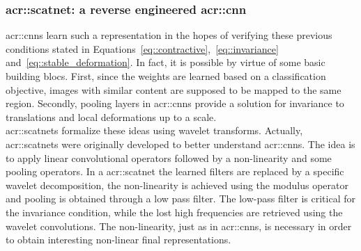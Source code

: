         \subsubsection{\gls*{acr::scatnet}: a reverse engineered \gls*{acr::cnn}}
            \glspl{acr::cnn} learn such a representation in the hopes of verifying these previous conditions stated in Equations~\ref{eq::contractive},~\ref{eq::invariance} and~\ref{eq::stable_deformation}.
            In fact, it is possible by virtue of some basic building blocs.
            First, since the weights are learned based on a classification objective, images with similar content are supposed to be mapped to the same region.
            Secondly, pooling layers in \glspl{acr::cnn} provide a solution for invariance to translations and local deformations up to a scale.\\

            \glspl{acr::scatnet} formalize these ideas using wavelet transforms.
            Actually, \glspl{acr::scatnet} were originally developed to better understand \glspl{acr::cnn}.
            The idea is to apply linear convolutional operators followed by a non-linearity and some pooling operators.
            In a \gls{acr::scatnet} the learned filters are replaced by a specific wavelet decomposition, the non-linearity is achieved using the modulus operator and pooling is obtained through a low pass filter.
            The low-pass filter is critical for the invariance condition, while the lost high frequencies are retrieved using the wavelet convolutions.
            The non-linearity, just as in \glspl{acr::cnn}, is necessary in order to obtain interesting non-linear final representations.\\

